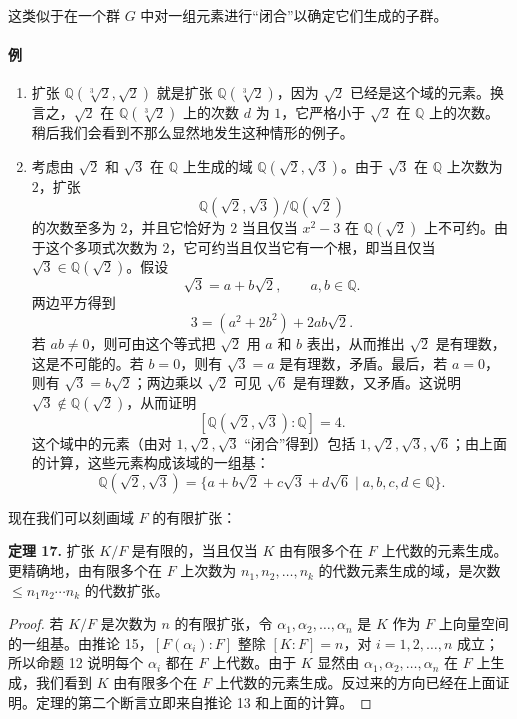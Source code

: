 这类似于在一个群 $G$ 中对一组元素进行“闭合”以确定它们生成的子群。

\paragraph{例}
\begin{enumerate}[label=(\arabic*)]
	\item 扩张 $\mathbb Q(\sqrt[3]{2},\sqrt2)$ 就是扩张 $\mathbb Q(\sqrt[3]{2})$，因为 $\sqrt2$ 已经是这个域的元素。换言之，$\sqrt2$ 在 $\mathbb Q(\sqrt[3]{2})$ 上的次数 $d$ 为 $1$，它严格小于 $\sqrt2$ 在 $\mathbb Q$ 上的次数。稍后我们会看到不那么显然地发生这种情形的例子。
	\item 考虑由 $\sqrt2$ 和 $\sqrt3$ 在 $\mathbb Q$ 上生成的域 $\mathbb Q(\sqrt2,\sqrt3)$。由于 $\sqrt3$ 在 $\mathbb Q$ 上次数为 $2$，扩张
	\[
	\mathbb Q(\sqrt2,\sqrt3)/\mathbb Q(\sqrt2)
	\]
	的次数至多为 $2$，并且它恰好为 $2$ 当且仅当 $x^2-3$ 在 $\mathbb Q(\sqrt2)$ 上不可约。由于这个多项式次数为 $2$，它可约当且仅当它有一个根，即当且仅当 $\sqrt3\in\mathbb Q(\sqrt2)$。假设
	\[
	\sqrt3=a+b\sqrt2,
	\qquad a,b\in\mathbb Q.
	\]
	两边平方得到
	\[
	3=(a^2+2b^2)+2ab\sqrt2.
	\]
	若 $ab\neq0$，则可由这个等式把 $\sqrt2$ 用 $a$ 和 $b$ 表出，从而推出 $\sqrt2$ 是有理数，这是不可能的。若 $b=0$，则有 $\sqrt3=a$ 是有理数，矛盾。最后，若 $a=0$，则有 $\sqrt3=b\sqrt2$；两边乘以 $\sqrt2$ 可见 $\sqrt6$ 是有理数，又矛盾。这说明 $\sqrt3\notin\mathbb Q(\sqrt2)$，从而证明
	\[
	[\mathbb Q(\sqrt2,\sqrt3):\mathbb Q]=4.
	\]
	这个域中的元素（由对 $1,\sqrt2,\sqrt3$ “闭合”得到）包括 $1,\sqrt2,\sqrt3,\sqrt6$；由上面的计算，这些元素构成该域的一组基：
	\[
	\mathbb Q(\sqrt2,\sqrt3)
	=\{a+b\sqrt2+c\sqrt3+d\sqrt6\mid a,b,c,d\in\mathbb Q\}.
	\]
\end{enumerate}

现在我们可以刻画域 $F$ 的有限扩张：

\noindent\textbf{定理 17.} 扩张 $K/F$ 是有限的，当且仅当 $K$ 由有限多个在 $F$ 上代数的元素生成。更精确地，由有限多个在 $F$ 上次数为 $n_1,n_2,\ldots,n_k$ 的代数元素生成的域，是次数 $\leq n_1n_2\cdots n_k$ 的代数扩张。

\begin{proof}
	若 $K/F$ 是次数为 $n$ 的有限扩张，令 $\alpha_1,\alpha_2,\ldots,\alpha_n$ 是 $K$ 作为 $F$ 上向量空间的一组基。由推论 15，$[F(\alpha_i):F]$ 整除 $[K:F]=n$，对 $i=1,2,\ldots,n$ 成立；所以命题 12 说明每个 $\alpha_i$ 都在 $F$ 上代数。由于 $K$ 显然由 $\alpha_1,\alpha_2,\ldots,\alpha_n$ 在 $F$ 上生成，我们看到 $K$ 由有限多个在 $F$ 上代数的元素生成。反过来的方向已经在上面证明。定理的第二个断言立即来自推论 13 和上面的计算。
\end{proof}

